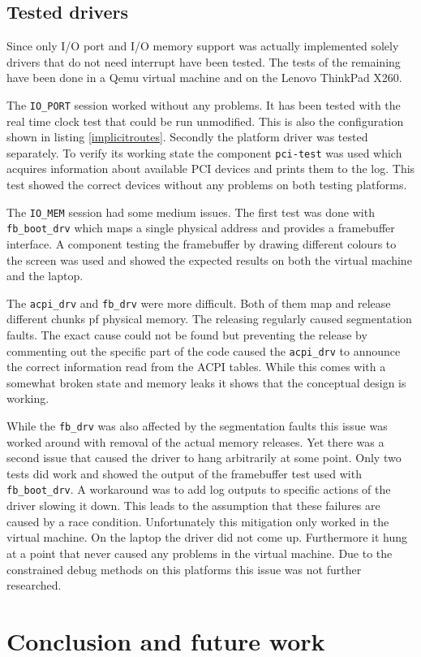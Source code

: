\documentclass[
a4paper,
12pt,
notitlepage,
parskip=half,
DIV=11,
]{scrbook}
\begin{document}
		\section{Tested drivers}
		
		Since only I/O port and I/O memory support was actually implemented solely drivers that do not need interrupt have been tested.
		The tests of the remaining have been done in a Qemu virtual machine and on the Lenovo ThinkPad X260.
		
		The \texttt{IO\_PORT} session worked without any problems.
		It has been tested with the real time clock test that could be run unmodified.
		This is also the configuration shown in listing \ref{implicitroutes}.
		Secondly the platform driver was tested separately.
		To verify its working state the component \texttt{pci-test} was used which acquires information about available PCI devices and prints them to the log.
		This test showed the correct devices without any problems on both testing platforms.
		
		The \texttt{IO\_MEM} session had some medium issues.
		The first test was done with \texttt{fb\_boot\_drv} which maps a single physical address and provides a framebuffer interface.
		A component testing the framebuffer by drawing different colours to the screen was used and showed the expected results on both the virtual machine and the laptop.
		
		The \texttt{acpi\_drv} and \texttt{fb\_drv} were more difficult.
		Both of them map and release different chunks pf physical memory.
		The releasing regularly caused segmentation faults.
		The exact cause could not be found but preventing the release by commenting out the specific part of the code caused the \texttt{acpi\_drv} to announce the correct information read from the ACPI tables.
		While this comes with a somewhat broken state and memory leaks it shows that the conceptual design is working.
		
		While the \texttt{fb\_drv} was also affected by the segmentation faults this issue was worked around with removal of the actual memory releases.
		Yet there was a second issue that caused the driver to hang arbitrarily at some point.
		Only two tests did work and showed the output of the framebuffer test used with \texttt{fb\_boot\_drv}.
		A workaround was to add log outputs to specific actions of the driver slowing it down.
		This leads to the assumption that these failures are caused by a race condition.
		Unfortunately this mitigation only worked in the virtual machine.
		On the laptop the driver did not come up.
		Furthermore it hung at a point that never caused any problems in the virtual machine.
		Due to the constrained debug methods on this platforms this issue was not further researched.
	
	\chapter{Conclusion and future work}
	
	
	
	
\end{document}
